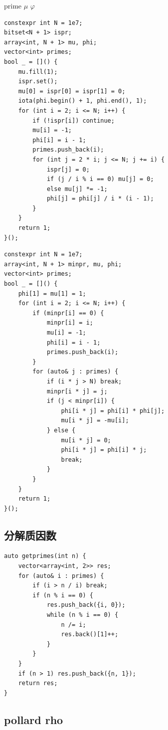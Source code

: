 \documentclass[UTF8, twoside]{ctexart}
\begin{document}
\begin{sloppypar}
prime $\mu$ $\varphi$

\begin{lstlisting}[style=cpp]
constexpr int N = 1e7;
bitset<N + 1> ispr;
array<int, N + 1> mu, phi;
vector<int> primes;
bool _ = []() {
    mu.fill(1);
    ispr.set();
    mu[0] = ispr[0] = ispr[1] = 0;
    iota(phi.begin() + 1, phi.end(), 1);
    for (int i = 2; i <= N; i++) {
        if (!ispr[i]) continue;
        mu[i] = -1;
        phi[i] = i - 1;
        primes.push_back(i);
        for (int j = 2 * i; j <= N; j += i) {
            ispr[j] = 0;
            if (j / i % i == 0) mu[j] = 0;
            else mu[j] *= -1;
            phi[j] = phi[j] / i * (i - 1);
        }
    }
    return 1;
}();
\end{lstlisting}

\begin{lstlisting}[style=cpp]
constexpr int N = 1e7;
array<int, N + 1> minpr, mu, phi;
vector<int> primes;
bool _ = []() {
    phi[1] = mu[1] = 1;
    for (int i = 2; i <= N; i++) {
        if (minpr[i] == 0) {
            minpr[i] = i;
            mu[i] = -1;
            phi[i] = i - 1;
            primes.push_back(i);
        }
        for (auto& j : primes) {
            if (i * j > N) break;
            minpr[i * j] = j;
            if (j < minpr[i]) {
                phi[i * j] = phi[i] * phi[j];
                mu[i * j] = -mu[i];
            } else {
                mu[i * j] = 0;
                phi[i * j] = phi[i] * j;
                break;
            }
        }
    }
    return 1;
}();
\end{lstlisting}

\subsection{分解质因数}

\begin{lstlisting}[style=cpp]
auto getprimes(int n) {
    vector<array<int, 2>> res;
    for (auto& i : primes) {
        if (i > n / i) break;
        if (n % i == 0) {
            res.push_back({i, 0});
            while (n % i == 0) {
                n /= i;
                res.back()[1]++;
            }
        }
    }
    if (n > 1) res.push_back({n, 1});
    return res;
}
\end{lstlisting}

\subsection{pollard rho}


\end{sloppypar}
\end{document}
